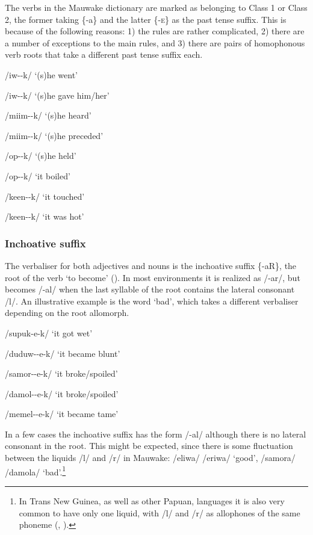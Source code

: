 The verbs in the Mauwake dictionary are marked as belonging to Class 1 or Class 2, the former taking \{-a\} and the latter \{-\textsc{e}\} as the past tense suffix. This is because of the following reasons: 1) the rules are rather complicated, 2) there are a number of exceptions to the main rules, and 3) there are pairs of homophonous verb roots that take a different past tense suffix each.

/iw--k/  `(s)he went'

/iw--k/  `(s)he gave him/her'

/miim--k/  `(s)he heard'

/miim--k/  `(s)he preceded'

/op--k/  `(s)he held'

/op--k/  `it boiled'

/keen--k/  `it touched'

/keen--k/  `it was hot'

\subsubsection{Inchoative suffix} 

The verbaliser for both adjectives and nouns is the inchoative suffix \{-aR\}, the root of the verb `to become' ().  In most environments it is realized as /\nobreakdash-ar/, but becomes /-al/ when the last syllable of the root contains the lateral consonant /l/.  An illustrative example is the word  `bad', which takes a different verbaliser depending on the root allomorph.

/supuk-e-k/  `it got wet'

/duduw--e-k/  `it became blunt'

/samor--e-k/  `it broke/spoiled'

/damol--e-k/  `it broke/spoiled'

/memel--e-k/  `it became tame'

In a few cases the inchoative suffix has the form /-al/ although there is no lateral consonant in the root.  This might be expected, since there is some fluctuation between the liquids /l/ and /r/ in Mauwake: /eliwa/ {\Tilde} /eriwa/ `good', /samora/ {\Tilde} /damola/ `bad'.\footnote{In Trans New Guinea, as well as other Papuan, languages it is also very common to have only one liquid, with /l/ and /r/ as allophones of the same phoneme (\citealt[55]{Wurm1982}, \citealt[55]{Foley1986}).} 

